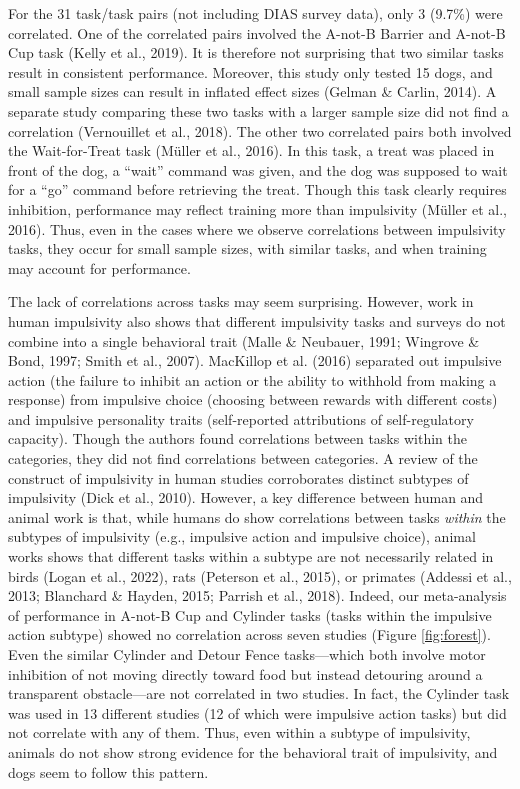 \documentclass[
  ,pub,floatsintext]{apa6}
\begin{document}
For the 31 task/task pairs (not including DIAS survey data), only 3 (9.7\%) were correlated. One of the correlated pairs involved the A-not-B Barrier and A-not-B Cup task (Kelly et al., 2019). It is therefore not surprising that two similar tasks result in consistent performance. Moreover, this study only tested 15 dogs, and small sample sizes can result in inflated effect sizes (Gelman \& Carlin, 2014). A separate study comparing these two tasks with a larger sample size did not find a correlation (Vernouillet et al., 2018). The other two correlated pairs both involved the Wait-for-Treat task (Müller et al., 2016). In this task, a treat was placed in front of the dog, a ``wait'' command was given, and the dog was supposed to wait for a ``go'' command before retrieving the treat. Though this task clearly requires inhibition, performance may reflect training more than impulsivity (Müller et al., 2016). Thus, even in the cases where we observe correlations between impulsivity tasks, they occur for small sample sizes, with similar tasks, and when training may account for performance.

The lack of correlations across tasks may seem surprising. However, work in human impulsivity also shows that different impulsivity tasks and surveys do not combine into a single behavioral trait (Malle \& Neubauer, 1991; Wingrove \& Bond, 1997; Smith et al., 2007). MacKillop et al. (2016) separated out impulsive action (the failure to inhibit an action or the ability to withhold from making a response) from impulsive choice (choosing between rewards with different costs) and impulsive personality traits (self-reported attributions of self-regulatory capacity). Though the authors found correlations between tasks within the categories, they did not find correlations between categories. A review of the construct of impulsivity in human studies corroborates distinct subtypes of impulsivity (Dick et al., 2010). However, a key difference between human and animal work is that, while humans do show correlations between tasks \emph{within} the subtypes of impulsivity (e.g., impulsive action and impulsive choice), animal works shows that different tasks within a subtype are not necessarily related in birds (Logan et al., 2022), rats (Peterson et al., 2015), or primates (Addessi et al., 2013; Blanchard \& Hayden, 2015; Parrish et al., 2018). Indeed, our meta-analysis of performance in A-not-B Cup and Cylinder tasks (tasks within the impulsive action subtype) showed no correlation across seven studies (Figure \ref{fig:forest}). Even the similar Cylinder and Detour Fence tasks---which both involve motor inhibition of not moving directly toward food but instead detouring around a transparent obstacle---are not correlated in two studies. In fact, the Cylinder task was used in 13 different studies (12 of which were impulsive action tasks) but did not correlate with any of them. Thus, even within a subtype of impulsivity, animals do not show strong evidence for the behavioral trait of impulsivity, and dogs seem to follow this pattern.
\end{document}

